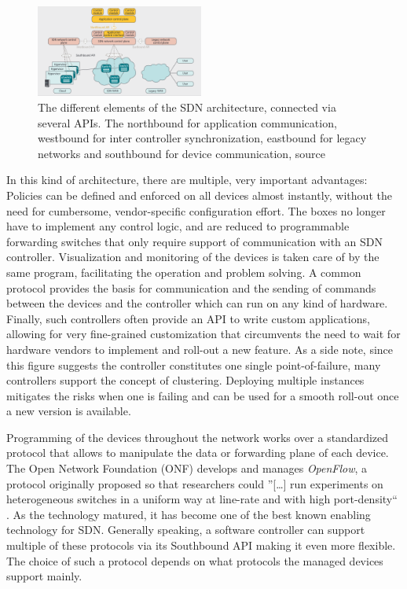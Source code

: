 \begin{figure}[h]
	\centering
	\includegraphics[width=0.49\textwidth]{images/sdnAPIs.png}
	\caption{The different elements of the SDN architecture, connected via several APIs. The northbound for application communication, westbound for inter controller synchronization, eastbound for legacy networks and southbound for device communication, source \cite{jarschel2014interfaces}}
	\label{img:sdnAPIs}
\end{figure}

In this kind of architecture, there are multiple, very important advantages: Policies can be defined and enforced on all devices almost instantly, without the need for cumbersome, vendor-specific configuration effort. The boxes no longer have to implement any control logic, and are reduced to programmable forwarding switches that only require support of communication with an SDN controller. Visualization and monitoring of the devices is taken care of by the same program, facilitating the operation and problem solving. A common protocol provides the basis for communication and the sending of commands between the devices and the controller which can run on any kind of hardware. Finally, such controllers often provide an API to write custom applications, allowing for very fine-grained customization that circumvents the need to wait for hardware vendors to implement and roll-out a new feature. As a side note, since this figure suggests the controller constitutes one single point-of-failure, many controllers support the concept of clustering. Deploying multiple instances mitigates the risks when one is failing and can be used for a smooth roll-out once a new version is available.  

Programming of the devices throughout the network works over a standardized protocol that allows to manipulate the data or forwarding plane of each device. The Open Network Foundation (ONF) develops and manages \textit{OpenFlow}, a protocol originally proposed so that researchers could ''[\dots] run experiments on heterogeneous switches in a uniform way at line-rate and with high port-density`` \cite{mckeown2008openflow}. As the technology matured, it has become one of the best known enabling technology for SDN. Generally speaking, a software controller can support multiple of these protocols via its Southbound API making it even more flexible. The choice of such a protocol depends on what protocols the managed devices support mainly. 

